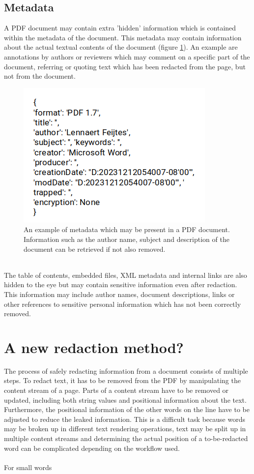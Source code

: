 \subsection{Metadata}
A PDF document may contain extra 'hidden' information which is contained within the metadata of the document. This metadata may contain information about the actual textual contents of the document (figure \ref{fig:metadataexmp}). An example are annotations by authors or reviewers which may comment on a specific part of the document, referring or quoting text which has been redacted from the page, but not from the document. 
\begin{figure}[h]
    \includegraphics[width=0.5\linewidth]{latex/media/metadata.png}
    \centering
    \caption{An example of metadata which may be present in a PDF document. Information such as the author name, subject and description of the document can be retrieved if not also removed.}
    \label{fig:metadataexmp}
\end{figure}\\
The table of contents, embedded files, XML metadata and internal links are also hidden to the eye but may contain sensitive information even after redaction. This information may include author names, document descriptions, links or other references to sensitive personal information which has not been correctly removed.

\section{A new redaction method?}
The process of safely redacting information from a document consists of multiple steps. To redact text, it has to be removed from the PDF by manipulating the content stream of a page.
Parts of a content stream have to be removed or updated, including both string values and positional information about the text. Furthermore, the positional information of the other words on the line have to be adjusted to reduce the leaked information. This is a difficult task because words may be broken up in different text rendering operations, text may be split up in multiple content streams and determining the actual position of a to-be-redacted word can be complicated depending on the workflow used. 
\\\\
For small words